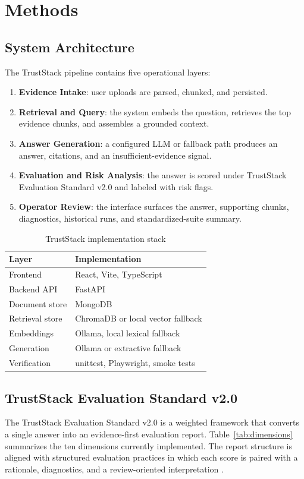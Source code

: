\documentclass[conference]{IEEEtran}
\newcommand{\TrustSection}[1]{\section{\texorpdfstring{\textcolor{TrustStackBlue}{#1}}{#1}}}
\newcommand{\TrustSubsection}[1]{\subsection{\texorpdfstring{\textcolor{TrustStackTeal}{#1}}{#1}}}
\begin{document}
\TrustSection{Methods}
\TrustSubsection{System Architecture}
The TrustStack pipeline contains five operational layers:
\begin{enumerate}
  \item \textbf{Evidence Intake}: user uploads are parsed, chunked, and persisted.
  \item \textbf{Retrieval and Query}: the system embeds the question, retrieves the top evidence chunks, and assembles a grounded context.
  \item \textbf{Answer Generation}: a configured LLM or fallback path produces an answer, citations, and an insufficient-evidence signal.
  \item \textbf{Evaluation and Risk Analysis}: the answer is scored under TrustStack Evaluation Standard v2.0 and labeled with risk flags.
  \item \textbf{Operator Review}: the interface surfaces the answer, supporting chunks, diagnostics, historical runs, and standardized-suite summary.
\end{enumerate}

\begin{table}[t]
  \caption{TrustStack implementation stack}
  \label{tab:stack}
  \centering
  \begin{tabular}{ll}
    \toprule
    \rowcolor{TrustStackBlue!12}
    \textcolor{TrustStackBlue}{Layer} & \textcolor{TrustStackBlue}{Implementation} \\
    \midrule
    Frontend & React, Vite, TypeScript \\
    Backend API & FastAPI \\
    Document store & MongoDB \\
    Retrieval store & ChromaDB or local vector fallback \\
    Embeddings & Ollama, local lexical fallback \\
    Generation & Ollama or extractive fallback \\
    Verification & unittest, Playwright, smoke tests \\
    \bottomrule
  \end{tabular}
\end{table}

\TrustSubsection{TrustStack Evaluation Standard v2.0}
The TrustStack Evaluation Standard v2.0 is a weighted framework that converts a single answer into an evidence-first evaluation report. Table~\ref{tab:dimensions} summarizes the ten dimensions currently implemented.
The report structure is aligned with structured evaluation practices in which each score is paired with a rationale, diagnostics, and a review-oriented interpretation \cite{openai2024evals}.
\end{document}
